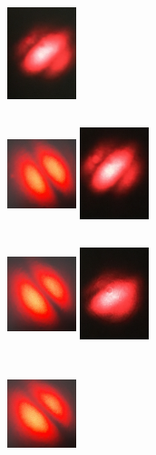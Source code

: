 \documentclass[12pt]{book}
\begin{document}
\begin{figure}[t!]
\begin{subfigure}[b]{0.3\linewidth}
\includegraphics[width=2cm,height=3cm]{images/fotos/92.jpg}
\caption{}
\end{subfigure}
\begin{subfigure}[b]{0.3\linewidth}
\centering
\includegraphics[width=2cm,height=3cm]{images/fotos/41.jpg}
\includegraphics[width=2cm,height=3cm]{images/fotos/82.jpg}
\caption{}
\end{subfigure}
\begin{subfigure}[b]{0.3\linewidth}
\centering
\includegraphics[width=2cm,height=3cm]{images/fotos/51.jpg}
\includegraphics[width=2cm,height=3cm]{images/fotos/72.jpg}
\caption{}
\end{subfigure}
\begin{subfigure}[b]{0.3\linewidth}
\centering
\includegraphics[width=2cm,height=3cm]{images/fotos/61.jpg}

\end{subfigure}
\end{figure}
\end{document}

